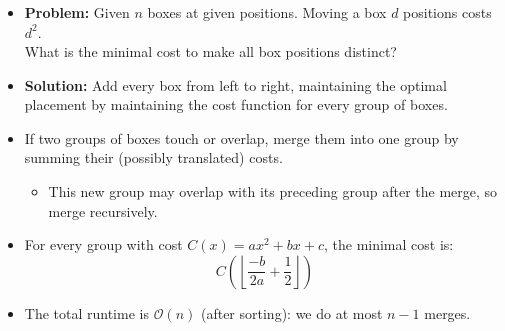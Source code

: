 \begin{frame}
    \frametitle{\problemtitle}
    \begin{itemize}
        \item \textbf{Problem:} Given $n$ boxes at given positions.
                Moving a box $d$ positions costs $d^2$. \\
                What is the minimal cost to make all box positions distinct?
        \item<+-> \textbf{Solution:} Add every box from left to right, maintaining the optimal placement
                    by maintaining the cost function for every group of boxes.
        \item<+-> If two groups of boxes touch or overlap, merge them into one group
                    by summing their (possibly translated) costs.
        \begin{itemize}
            \item This new group may overlap with its preceding group after the merge, so merge recursively.
        \end{itemize}
        \item<+-> For every group with cost $C(x) = ax^2 + bx + c$, the minimal cost is:
        \[ C\left(\left\lfloor \frac{-b}{2a} + \frac12\right\rfloor \right) \]

        \item<+-> The total runtime is $\mathcal O(n)$ (after sorting): we do at most $n - 1$ merges.
    \end{itemize}
    \solvestats
\end{frame}
